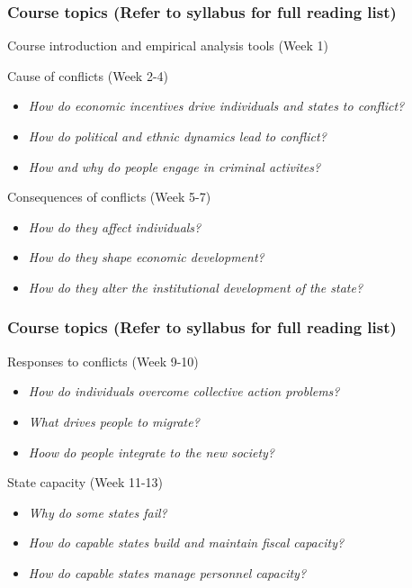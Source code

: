 \documentclass[aspectratio=169]{beamer}
\newenvironment{wideitemize}{\itemize\addtolength{\itemsep}{10pt}}{\enditemize}
\begin{document}
\begin{frame}
\frametitle{Course topics (Refer to syllabus for full reading list)} 
\begin{wideitemize}
  \item Course introduction and empirical analysis tools (Week 1)
\item Cause of conflicts (Week 2-4)
\begin{itemize}
\item \textit{How do economic incentives drive individuals and states to conflict?}
\item \textit{How do political and ethnic dynamics lead to conflict?}
\item \textit{How and why do people engage in criminal activites?}
\end{itemize}
\item Consequences of conflicts (Week 5-7)
\begin{itemize}
\item \textit{How do they affect individuals?}
\item \textit{How do they shape economic development?}
\item \textit{How do they alter the institutional development of the state?}
\end{itemize}

\end{wideitemize}
\end{frame}

\begin{frame}
\frametitle{Course topics (Refer to syllabus for full reading list)} 
\begin{wideitemize}

\item Responses to conflicts (Week 9-10)
\begin{itemize}
\item \textit{How do individuals overcome collective action problems?}
\item \textit{What drives people to migrate?}
\item \textit{Hoow do people integrate to the new society?}
\end{itemize}
\item State capacity (Week 11-13)
\begin{itemize}
\item \textit{Why do some states fail?}
\item \textit{How do capable states build and maintain fiscal capacity?}
\item \textit{How do capable states manage personnel capacity?}
\end{itemize}

\end{wideitemize}
\end{frame}
\end{document}

